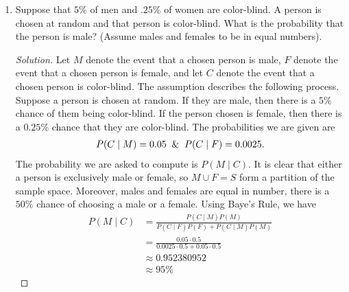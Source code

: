 \documentclass[12pt]{article}
\theoremstyle{definition}
\theoremstyle{plain}
\newenvironment{solution}
  {\begin{proof}[Solution]}
  {\end{proof}}
\begin{document}
\begin{enumerate}
\begin{solution}
	There are $ N $ candidates in total and each candidate is randomly picked for a given trial. Thus, each candidate is picked for a trial with equal chance. Let $ B $ be the best candidate of the $ N $ candidates. By rule (b), if the $ i $th candidate was hired, then the first $ i-1 $ candidates were removed from the list of employees before going into the trial. If the first candidate was hired, there is a $ \frac{1}{N} $ chance that the candidate was $ B $. Assuming the second candidate was hired, this means that there are now $ N - 1 $ candidates to choose from going into the second trial. Thus, there is a $ \frac{1}{N - 1} $ chance that the candidate was $ B $. Continuing in this manner, if the $ i $th candidate was hired then going into the trial there are $ N - (i - 1) $ candidates left. There is a $ \frac{1}{N - (i - 1)} $ chance that the $ i $th candidate hired was $ B $.
\end{solution}

\item Suppose that $ 5 \% $ of men and $ .25 \% $ of women are color-blind. A person is chosen at random and that person is color-blind. What is the probability that the person is male? (Assume males and females to be in equal numbers).

\begin{solution}
	Let $ M $ denote the event that a chosen person is male, $ F $ denote the event that a chosen person is female, and let $ C $ denote the event that a chosen person is color-blind. The assumption describes the following process. Suppose a person is chosen at random. If they are male, then there is a $ 5 \% $ chance of them being color-blind. If the person chosen is female, then there is a $ 0.25 \% $ chance that they are color-blind. The probabilities we are given are
	\begin{align*}
		P(C \mid M) = 0.05 \And P(C \mid F) = 0.0025.
	\end{align*}
	The probability we are asked to compute is $ P(M \mid C) $. It is clear that either a person is exclusively male or female, so $ M \cup F = S $ form a partition of the sample space. Moreover, males and females are equal in number, there is a $ 50\% $ chance of choosing a male or a female. Using Baye's Rule, we have
	\begin{align*}
		P(M \mid C) &= \frac{ P(C \mid M) P(M) }{ P(C \mid F) P(F) + P(C \mid M) P(M)}\\
		&= \frac{ 0.05 \cdot 0.5 }{0.0025  \cdot 0.5 + 0.05 \cdot 0.5}\\
		&\approx 0.952380952\\
		&\approx 95\%
	\end{align*}
\end{solution}


\end{enumerate}
\end{document}
